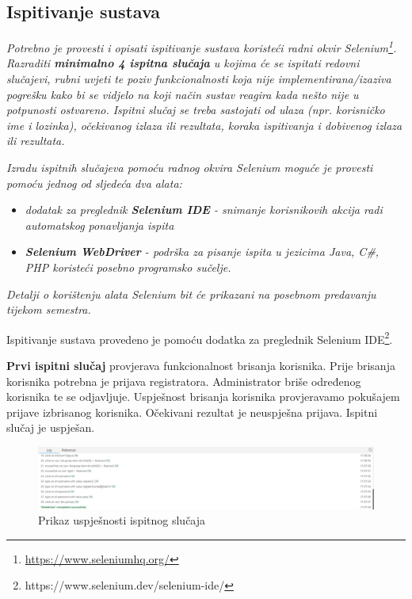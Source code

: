 			
			\subsection{Ispitivanje sustava}
			
			 \textit{Potrebno je provesti i opisati ispitivanje sustava koristeći radni okvir Selenium\footnote{\url{https://www.seleniumhq.org/}}. Razraditi \textbf{minimalno 4 ispitna slučaja} u kojima će se ispitati redovni slučajevi, rubni uvjeti te poziv funkcionalnosti koja nije implementirana/izaziva pogrešku kako bi se vidjelo na koji način sustav reagira kada nešto nije u potpunosti ostvareno. Ispitni slučaj se treba sastojati od ulaza (npr. korisničko ime i lozinka), očekivanog izlaza ili rezultata, koraka ispitivanja i dobivenog izlaza ili rezultata.\\ }
			 
			 \textit{Izradu ispitnih slučajeva pomoću radnog okvira Selenium moguće je provesti pomoću jednog od sljedeća dva alata:}
			 \begin{itemize}
			 	\item \textit{dodatak za preglednik \textbf{Selenium IDE} - snimanje korisnikovih akcija radi automatskog ponavljanja ispita	}
			 	\item \textit{\textbf{Selenium WebDriver} - podrška za pisanje ispita u jezicima Java, C\#, PHP koristeći posebno programsko sučelje.}
			 \end{itemize}
		 	\textit{Detalji o korištenju alata Selenium bit će prikazani na posebnom predavanju tijekom semestra.}
		 	
		 	Ispitivanje sustava provedeno je pomoću dodatka za preglednik Selenium IDE\footnote{https://www.selenium.dev/selenium-ide/}.
		 	
		 	\textbf{Prvi ispitni slučaj} provjerava funkcionalnost brisanja korisnika. Prije brisanja korisnika potrebna je prijava registratora. Administrator briše određenog korisnika te se odjavljuje. Uspješnost brisanja korisnika provjeravamo pokušajem prijave izbrisanog korisnika. Očekivani rezultat je neuspješna prijava. Ispitni slučaj je uspješan.
		 	
		 	\begin{figure} [hbt!]
		 		\includegraphics[width=\linewidth]{Slike/deleteUser}
		 		\caption{Prikaz uspješnosti ispitnog slučaja}
		 	\end{figure}
		 	

